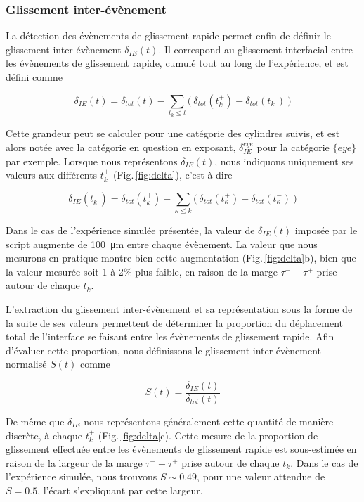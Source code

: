 \subsubsection{Glissement inter-évènement}

La détection des évènements de glissement rapide permet enfin de définir le glissement inter-évènement $\delta_{IE}(t)$. Il correspond au glissement interfacial entre les évènements de glissement rapide, cumulé tout au long de l'expérience, et est défini comme

\begin{equation}
\delta_{IE}(t) = \delta_{tot}(t)-\sum_{t_k\leq t}\Big(\: \delta_{tot}(t_k^+)-\delta_{tot}(t_k^-)\:\Big)
\end{equation}

Cette grandeur peut se calculer pour une catégorie des cylindres suivis, et est alors notée avec la catégorie en question en exposant, $\delta_{IE}^{eye}$ pour la catégorie $\{eye\}$ par exemple. Lorsque nous représentons $\delta_{IE}(t)$, nous indiquons uniquement ses valeurs aux différents $t_k^+$ (Fig.\,\ref{fig:delta}), c'est à dire

\begin{equation}
\delta_{IE}(t_k^+) = \delta_{tot}(t_k^+)-\sum_{\kappa\leq k} \Big(\:\delta_{tot}(t_\kappa^+)-\delta_{tot}(t_\kappa^-)\:\Big)
\end{equation}


Dans le cas de l'expérience simulée présentée, la valeur de $\delta_{IE}(t)$ imposée par le script augmente de \SI{100}{\micro\meter} entre chaque évènement. La valeur que nous mesurons en pratique montre bien cette augmentation (Fig.\,\ref{fig:delta}b), bien que la valeur mesurée soit 1 à 2\% plus faible, en raison de la marge $\tau^-+\tau^+$ prise autour de chaque $t_k$.

\pagebreak

L'extraction du glissement inter-évènement et sa représentation sous la forme de la suite de ses valeurs permettent de déterminer la proportion du déplacement total de l'interface se faisant entre les évènements de glissement rapide. Afin d'évaluer cette proportion, nous définissons le glissement inter-évènement normalisé $S(t)$ comme

\begin{equation}
S(t) = \dfrac{\delta_{IE}(t)}{\delta_{tot}(t)}
\end{equation}

De même que $\delta_{IE}$ nous représentons généralement cette quantité de manière discrète, à chaque $t_k^+$ (Fig.\,\ref{fig:delta}c). Cette mesure de la proportion de glissement effectuée entre les évènements de glissement rapide est sous-estimée en raison de la largeur de la marge $\tau^-+\tau^+$ prise autour de chaque $t_k$. Dans le cas de l'expérience simulée, nous trouvons $S\sim 0.49$, pour une valeur attendue de $S=0.5$, l'écart s’expliquant par cette largeur.




